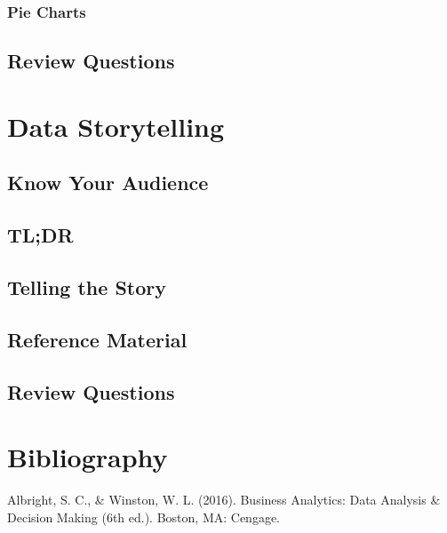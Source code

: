 \documentclass[
]{book}
\begin{document}
\hypertarget{pie-charts}{%
\subsection{Pie Charts}\label{pie-charts}}

\hypertarget{review-questions-12}{%
\section{Review Questions}\label{review-questions-12}}

\hypertarget{storytelling}{%
\chapter{Data Storytelling}\label{storytelling}}

\hypertarget{know-your-audience}{%
\section{Know Your Audience}\label{know-your-audience}}

\hypertarget{tldr}{%
\section{TL;DR}\label{tldr}}

\hypertarget{telling-the-story}{%
\section{Telling the Story}\label{telling-the-story}}

\hypertarget{reference-material}{%
\section{Reference Material}\label{reference-material}}

\hypertarget{review-questions-13}{%
\section{Review Questions}\label{review-questions-13}}

\hypertarget{bibli}{%
\chapter{Bibliography}\label{bibli}}

Albright, S. C., \& Winston, W. L. (2016). Business Analytics: Data Analysis \& Decision Making (6th ed.). Boston, MA: Cengage.
\end{document}
